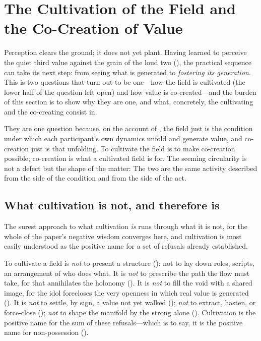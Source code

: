\section{The Cultivation of the Field and the Co-Creation of Value}
\label{p09:sec:cocreation}

\noindent
Perception clears the ground; it does not yet plant. Having learned to perceive the quiet third value against the grain of the loud two (), the practical sequence can take its next step: from seeing what is generated to \emph{fostering its generation}. This is two questions that turn out to be one---how the field is cultivated (the lower half of the question  left open) and how value is co-created---and the burden of this section is to show why they are one, and what, concretely, the cultivating and the co-creating consist in.

They are one question because, on the account of , the field just is the condition under which each participant's own dynamics unfold and generate value, and co-creation just is that unfolding. To cultivate the field is to make co-creation possible; co-creation is what a cultivated field is for. The seeming circularity is not a defect but the shape of the matter:  The two are the same activity described from the side of the condition and from the side of the act.

\subsection{What cultivation is not, and therefore is}
\label{p09:sec:cultivation-negative}

The surest approach to what cultivation \emph{is} runs through what it is not, for the whole of the paper's negative wisdom converges here, and cultivation is most easily understood as the positive name for a set of refusals already established.

To cultivate a field is \emph{not} to present a structure (): not to lay down roles, scripts, an arrangement of who does what. It is \emph{not} to prescribe the path the flow must take, for that annihilates the holonomy (). It is \emph{not} to fill the void with a shared image, for the idol forecloses the very openness in which real value is generated (). It is \emph{not} to settle, by sign, a value not yet walked (); \emph{not} to extract, hasten, or force-close (); \emph{not} to shape the manifold by the strong alone (). Cultivation is the positive name for the sum of these refusals---which is to say, it is the positive name for non-possession ().


